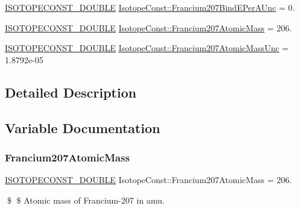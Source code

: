 \begin{DoxyCompactItemize}
\mbox{\hyperlink{group___isotope_const-_macros_ga8f45a7272ce02c0b4c65c44636ed719a}{I\+S\+O\+T\+O\+P\+E\+C\+O\+N\+S\+T\+\_\+\+D\+O\+U\+B\+LE}} \mbox{\hyperlink{group___isotope_const-_francium-_fr207_ga547de746839b4444f9ba3fcc180d6889}{Isotope\+Const\+::\+Francium207\+Bind\+E\+Per\+A\+Unc}} = 0.
\item 
\mbox{\hyperlink{group___isotope_const-_macros_ga8f45a7272ce02c0b4c65c44636ed719a}{I\+S\+O\+T\+O\+P\+E\+C\+O\+N\+S\+T\+\_\+\+D\+O\+U\+B\+LE}} \mbox{\hyperlink{group___isotope_const-_francium-_fr207_gafc5b1f54804a4bdd877e7d2b3f4778c8}{Isotope\+Const\+::\+Francium207\+Atomic\+Mass}} = 206.
\item 
\mbox{\hyperlink{group___isotope_const-_macros_ga8f45a7272ce02c0b4c65c44636ed719a}{I\+S\+O\+T\+O\+P\+E\+C\+O\+N\+S\+T\+\_\+\+D\+O\+U\+B\+LE}} \mbox{\hyperlink{group___isotope_const-_francium-_fr207_ga85714bf06b02420be734338f4f15459c}{Isotope\+Const\+::\+Francium207\+Atomic\+Mass\+Unc}} = 1.\+8792e-\/05
\end{DoxyCompactItemize}


\subsection{Detailed Description}


\subsection{Variable Documentation}
\mbox{\label{group___isotope_const-_francium-_fr207_gafc5b1f54804a4bdd877e7d2b3f4778c8}} 
\subsubsection{\texorpdfstring{Francium207\+Atomic\+Mass}{Francium207AtomicMass}}
{\footnotesize\ttfamily \mbox{\hyperlink{group___isotope_const-_macros_ga8f45a7272ce02c0b4c65c44636ed719a}{I\+S\+O\+T\+O\+P\+E\+C\+O\+N\+S\+T\+\_\+\+D\+O\+U\+B\+LE}} Isotope\+Const\+::\+Francium207\+Atomic\+Mass = 206.}

\$ \$ Atomic mass of Francium-\/207 in amu. \mbox{\label{group___isotope_const-_francium-_fr207_ga85714bf06b02420be734338f4f15459c}} 
